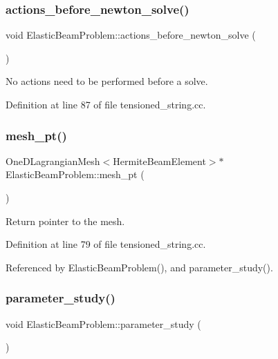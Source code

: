 \subsubsection{\texorpdfstring{actions\+\_\+before\+\_\+newton\+\_\+solve()}{actions\_before\_newton\_solve()}}
{\footnotesize\ttfamily void Elastic\+Beam\+Problem\+::actions\+\_\+before\+\_\+newton\+\_\+solve (\begin{DoxyParamCaption}{ }\end{DoxyParamCaption})\hspace{0.3cm}{\ttfamily [inline]}}



No actions need to be performed before a solve. 



Definition at line 87 of file tensioned\+\_\+string.\+cc.

\mbox{\label{classElasticBeamProblem_ae7d14ba8bec2325a82cbeed0c1b29910}} 
\subsubsection{\texorpdfstring{mesh\+\_\+pt()}{mesh\_pt()}}
{\footnotesize\ttfamily One\+D\+Lagrangian\+Mesh$<$Hermite\+Beam\+Element$>$$\ast$ Elastic\+Beam\+Problem\+::mesh\+\_\+pt (\begin{DoxyParamCaption}{ }\end{DoxyParamCaption})\hspace{0.3cm}{\ttfamily [inline]}}



Return pointer to the mesh. 



Definition at line 79 of file tensioned\+\_\+string.\+cc.



Referenced by Elastic\+Beam\+Problem(), and parameter\+\_\+study().

\mbox{\label{classElasticBeamProblem_a2da3cb02ce953da67fb27742e20774a5}} 
\subsubsection{\texorpdfstring{parameter\+\_\+study()}{parameter\_study()}}
{\footnotesize\ttfamily void Elastic\+Beam\+Problem\+::parameter\+\_\+study (\begin{DoxyParamCaption}{ }\end{DoxyParamCaption})}



